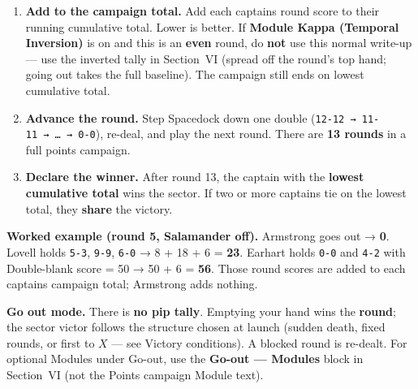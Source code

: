 \documentclass[11pt]{article}
\providecommand{\tightlist}{%
  \setlength{\itemsep}{0pt}\setlength{\parskip}{0pt}}
\begin{document}
\begin{enumerate}
  \begin{itemize}
  \tightlist
  \item
    \textbf{Double-blank (0-0):} scored by the \textbf{Double-blank
    score} setting --- \textbf{50} (tournament standard, the default for
    hand-built rule sets), \textbf{25}, or \textbf{0} (its 0 pips). The
    \textbf{Official Warp rules} preset uses \textbf{0}.
  \item
    \textbf{Salamander Penalty (Module Beta):} a held \textbf{highest
    double} (\texttt{maxPip-maxPip}) scores \textbf{double its both-ends
    value} from round 2 onward --- eg Warp 12 \textbf{12-12 → 48}, Warp
    18 \textbf{18-18 → 72}. See \textbf{Section VI → Module Beta}.
  \end{itemize}
\item
  \textbf{Add to the campaign total.} Add each captain\textquotesingle s
  round score to their running cumulative total. Lower is better. If
  \textbf{Module Kappa (Temporal Inversion)} is on and this is an
  \textbf{even} round, do \textbf{not} use this normal write-up --- use
  the inverted tally in Section~VI (spread off the round's top hand;
  going out takes the full baseline). The campaign still ends on lowest
  cumulative total.
\item
  \textbf{Advance the round.} Step Spacedock down one double
  (\texttt{12-12\ →\ 11-11\ →\ …\ →\ 0-0}), re-deal, and play the next
  round. There are \textbf{13 rounds} in a full points campaign.
\item
  \textbf{Declare the winner.} After round 13, the captain with the
  \textbf{lowest cumulative total} wins the sector. If two or more
  captains tie on the lowest total, they \textbf{share} the victory.
\end{enumerate}

\textbf{Worked example (round 5, Salamander off).} Armstrong goes out →
\textbf{0}. Lovell holds \texttt{5-3}, \texttt{9-9}, \texttt{6-0} → 8 +
18 + 6 = \textbf{23}. Earhart holds \texttt{0-0} and \texttt{4-2} with
Double-blank score = 50 → 50 + 6 = \textbf{56}. Those round scores are
added to each captain\textquotesingle s campaign total; Armstrong adds
nothing.

\textbf{Go out mode.} There is \textbf{no pip tally}. Emptying your hand
wins the \textbf{round}; the sector victor follows the structure chosen
at launch (sudden death, fixed rounds, or first to $X$ --- see
Victory conditions). A blocked round is re-dealt. For optional Modules
under Go-out, use the \textbf{Go-out --- Modules} block in Section~VI
(not the Points campaign Module text).
\end{document}
